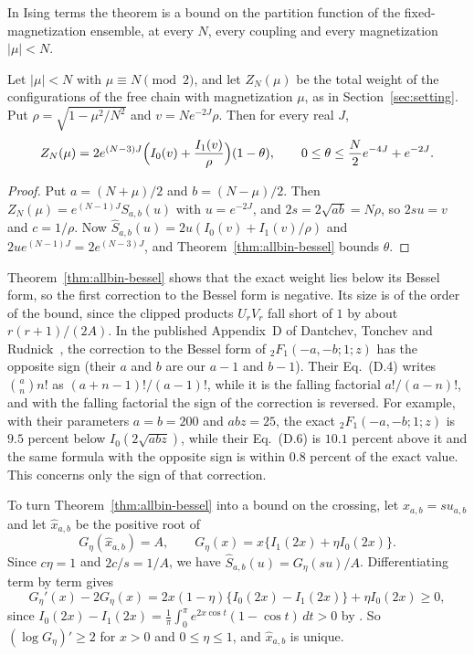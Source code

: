 In Ising terms the theorem is a bound on the partition function of the
fixed-magnetization ensemble, at every $N$, every coupling and every
magnetization $|\mu|<N$.

\begin{corollary}\label{cor:fixed-M}
Let $|\mu|<N$ with $\mu\equiv N\pmod2$, and let $Z_N(\mu)$ be the total
weight of the configurations of the free chain with magnetization $\mu$, as
in Section~\ref{sec:setting}. Put $\rho=\sqrt{1-\mu^2/N^2}$ and
$v=Ne^{-2J}\rho$. Then for every real $J$,
\[
Z_N(\mu)=2e^{(N-3)J}\Bigl(I_0(v)+\frac{I_1(v)}\rho\Bigr)(1-\theta),\qquad
0\le\theta\le\frac N2e^{-4J}+e^{-2J}.
\]
\end{corollary}

\begin{proof}
Put $a=(N+\mu)/2$ and $b=(N-\mu)/2$. Then $Z_N(\mu)=e^{(N-1)J}S_{a,b}(u)$ with
$u=e^{-2J}$, and $2s=2\sqrt{ab}=N\rho$, so $2su=v$ and $c=1/\rho$. Now
$\widehat S_{a,b}(u)=2u(I_0(v)+I_1(v)/\rho)$ and $2ue^{(N-1)J}=2e^{(N-3)J}$, and
Theorem~\ref{thm:allbin-bessel} bounds $\theta$.
\end{proof}

\begin{remark}\label{rem:sign-correction}
Theorem~\ref{thm:allbin-bessel} shows that the exact weight lies below its
Bessel form, so the first correction to the Bessel form is negative. Its size
is of the order of the bound, since the clipped products $U_rV_r$ fall short
of $1$ by about $r(r+1)/(2A)$. In the published Appendix~D of Dantchev,
Tonchev and Rudnick~\cite[p.~19, Eqs.~(D.4) and (D.6)]{dantchev2023}, the
correction to the Bessel form of ${}_2F_1(-a,-b;1;z)$ has the opposite sign
(their $a$ and $b$ are our $a-1$ and $b-1$). Their
Eq.~(D.4) writes $\binom an n!$ as $(a+n-1)!/(a-1)!$, while it is the falling
factorial $a!/(a-n)!$, and with the falling factorial the sign of the
correction is reversed. For example, with their parameters $a=b=200$ and $abz=25$, the
exact ${}_2F_1(-a,-b;1;z)$ is $9.5$ percent below $I_0(2\sqrt{abz})$, while
their Eq.~(D.6) is $10.1$ percent above it and the same formula with the
opposite sign is within $0.8$ percent of the exact value. This concerns
only the sign of that correction.
\end{remark}

To turn Theorem~\ref{thm:allbin-bessel} into a bound on the crossing, let $x_{a,b}=su_{a,b}$ and let
$\hat x_{a,b}$ be the positive root of
\begin{equation}\label{eq:allbin-bessel-root}
 G_\eta(\hat x_{a,b})=A,\qquad
 G_\eta(x)=x\{I_1(2x)+\eta I_0(2x)\}.
\end{equation}
Since $c\eta=1$ and $2c/s=1/A$, we have $\widehat S_{a,b}(u)=G_\eta(su)/A$.
Differentiating term by term gives
\begin{equation}\label{eq:allbin-logderivative}
 G_\eta'(x)-2G_\eta(x)
 =2x(1-\eta)\{I_0(2x)-I_1(2x)\}+\eta I_0(2x)\ge0,
\end{equation}
since $I_0(2x)-I_1(2x)=\frac1\pi\int_0^\pi e^{2x\cos t}(1-\cos t)\,dt>0$
by \cite[Eq.~10.32.3]{dlmf}. So $(\log G_\eta)'\ge2$ for $x>0$ and
$0\le\eta\le1$, and $\hat x_{a,b}$ is unique.

